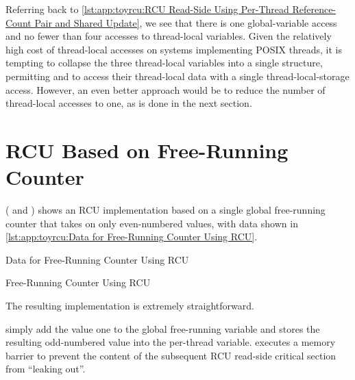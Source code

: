 Referring back to
\cref{lst:app:toyrcu:RCU Read-Side Using Per-Thread Reference-Count Pair and Shared Update},
we see that there is one global-variable access and no fewer than four
accesses to thread-local variables.
Given the relatively high cost of thread-local accesses on systems
implementing POSIX threads, it is tempting to collapse the three
thread-local variables into a single structure, permitting
 and  to access their
thread-local data with a single thread-local-storage access.
However, an even better approach would be to reduce the number of
thread-local accesses to one, as is done in the next section.

\section{RCU Based on Free-Running Counter}
\label{sec:app:toyrcu:RCU Based on Free-Running Counter}

( and )
shows an RCU implementation based on a single global free-running counter
that takes on only even-numbered values, with data shown in
\cref{lst:app:toyrcu:Data for Free-Running Counter Using RCU}.

\begin{listing}

\caption{Data for Free-Running Counter Using RCU}
\label{lst:app:toyrcu:Data for Free-Running Counter Using RCU}
\end{listing}

\begin{listing}
\vspace*{-11pt}
\caption{Free-Running Counter Using RCU}
\label{lst:app:toyrcu:Free-Running Counter Using RCU}
\end{listing}

The resulting  implementation is extremely
straightforward.
\begin{fcvref}
 simply
add the value one to the global free-running 
variable and stores the resulting odd-numbered value into the
 per-thread variable.
 executes a memory barrier to prevent the content of the
subsequent RCU read-side critical section from ``leaking out''.
\end{fcvref}

